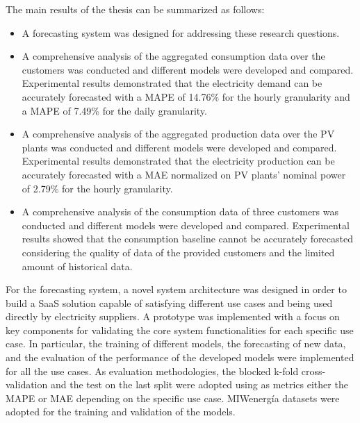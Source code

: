 The main results of the thesis can be summarized as follows:
\begin{itemize}
  \item A forecasting system was designed for addressing these research questions.
  \item A comprehensive analysis of the aggregated consumption data over the customers was conducted and different models were developed and compared. Experimental results demonstrated that the electricity demand can be accurately forecasted with a MAPE of 14.76\% for the hourly granularity and a MAPE of 7.49\% for the daily granularity.
  \item A comprehensive analysis of the aggregated production data over the PV plants was conducted and different models were developed and compared. Experimental results demonstrated that the electricity production can be accurately forecasted with a MAE normalized on PV plants' nominal power of 2.79\% for the hourly granularity.
  \item A comprehensive analysis of the consumption data of three customers was conducted and different models were developed and compared. Experimental results showed that the consumption baseline cannot be accurately forecasted considering the quality of data of the provided customers and the limited amount of historical data.
\end{itemize}

For the forecasting system, a novel system architecture was designed in order to build a SaaS solution capable of satisfying different use cases and being used directly by electricity suppliers.
A prototype was implemented with a focus on key components for validating the core system functionalities for each specific use case.
In particular, the training of different models, the forecasting of new data, and the evaluation of the performance of the developed models were implemented for all the use cases.
As evaluation methodologies, the blocked k-fold cross-validation and the test on the last split were adopted using as metrics either the MAPE or MAE depending on the specific use case.
MIWenergía datasets were adopted for the training and validation of the models.

